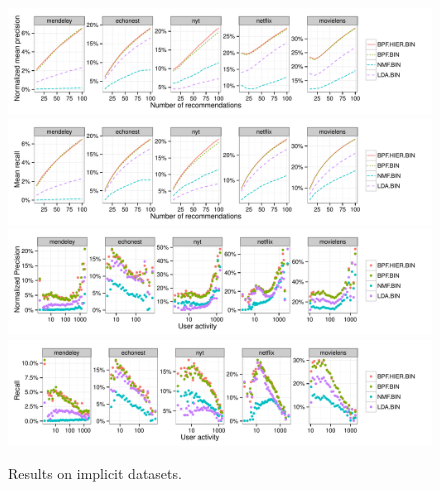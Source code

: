\begin{figure}[th]
\centering
\includegraphics[width=\textwidth]{./figures/implicit/meanprecision.pdf}\\               
\includegraphics[width=\textwidth]{./figures/implicit/meanrecall.pdf}\\               
\includegraphics[width=\textwidth]{./figures/implicit/useractivity-precision.pdf}\\
\includegraphics[width=\textwidth]{./figures/implicit/useractivity-recall.pdf}\\
\caption{Results on implicit datasets.}
\label{fig:precision_by_M}
\end{figure}

